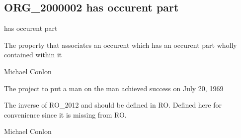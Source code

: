 \documentclass[letterpaper,10pt,english]{sphinxmanual}
\begin{document}
\subsection{ORG\_2000002 \sphinxhyphen{} has occurent part}
\label{\detokenize{doc-ORG_2000002:org-2000002-has-occurent-part}}\label{\detokenize{doc-ORG_2000002:index-0}}\label{\detokenize{doc-ORG_2000002::doc}}
\begin{sphinxShadowBox}

\sphinxAtStartPar
has occurent part
\end{sphinxShadowBox}

\begin{sphinxShadowBox}

\sphinxAtStartPar
The property that associates an occurent which has an occurent part wholly contained within it
\end{sphinxShadowBox}

\begin{sphinxShadowBox}

\sphinxAtStartPar
Michael Conlon 
\end{sphinxShadowBox}

\begin{sphinxShadowBox}

\sphinxAtStartPar
The project to put a man on the man achieved success on July 20, 1969
\end{sphinxShadowBox}

\begin{sphinxShadowBox}

\sphinxAtStartPar
The inverse of RO\_2012 and should be defined in RO.  Defined here for convenience since it is missing from RO.
\end{sphinxShadowBox}

\begin{sphinxShadowBox}

\sphinxAtStartPar
Michael Conlon 
\end{sphinxShadowBox}
\begin{quote}

\ignorespaces \end{quote}
\end{document}
